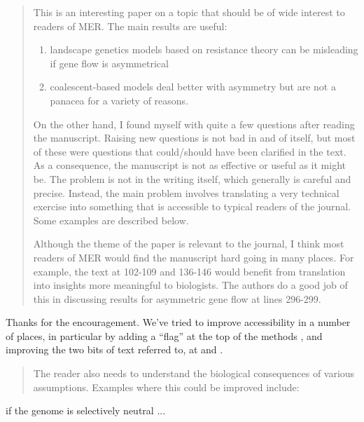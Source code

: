 \begin{quote}
    This is an interesting paper on a topic that should be of wide interest to
    readers of MER.  The main results are useful: 
    \begin{enumerate}
        \item      landscape genetics models based on resistance theory can be
            misleading if gene flow is asymmetrical
        \item      coalescent-based models deal better with asymmetry but are
            not a panacea for a variety of reasons.
    \end{enumerate}
    On the other hand, I found myself with quite a few questions after reading
    the manuscript.  Raising new questions is not bad in and of itself, but
    most of these were questions that could/should have been clarified in the
    text.  As a consequence, the manuscript is not as effective or useful as it
    might be.  The problem is not in the writing itself, which generally is
    careful and precise.  Instead, the main problem involves translating a very
    technical exercise into something that is accessible to typical readers of
    the journal.  Some examples are described below.

    Although the theme of the paper is relevant to the journal, I think most
    readers of MER would find the manuscript hard going in many places.  For
    example, the text at 102-109 and 136-146 would benefit from translation
    into insights more meaningful to biologists.  The authors do a good job of
    this in discussing results for asymmetric gene flow at lines 296-299. %
\end{quote}

Thanks for the encouragement.
We've tried to improve accessibility in a number of places,
in particular by adding a ``flag'' at the top of the methods {},
and improving the two bits of text referred to,
at {} and {}.


\begin{quote}
    The reader also needs to understand the biological consequences of various
    assumptions.  Examples  where this could be improved include:
\end{quote}

\begin{point}{\revref}
      if the genome is selectively neutral ...
\end{point}


